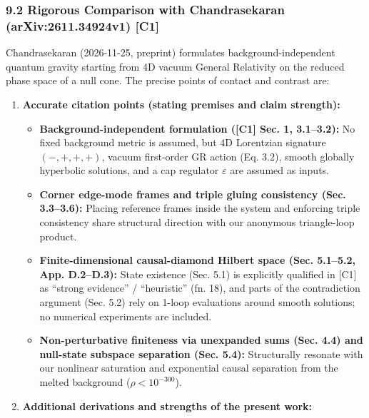 \documentclass[
  a4paper,
]{article}
\providecommand{\tightlist}{%
  \setlength{\itemsep}{0pt}\setlength{\parskip}{0pt}}
\begin{document}
\subsubsection{9.2 Rigorous Comparison with Chandrasekaran
(arXiv:2611.34924v1)
{[}C1{]}}\label{rigorous-comparison-with-chandrasekaran-arxiv2611.34924v1-c1}

Chandrasekaran (2026-11-25, preprint) formulates background-independent
quantum gravity starting from 4D vacuum General Relativity on the
reduced phase space of a null cone. The precise points of contact and
contrast are:

\begin{enumerate}
\def\labelenumi{\arabic{enumi}.}
\tightlist
\item
  \textbf{Accurate citation points (stating premises and claim
  strength):}

  \begin{itemize}
  \tightlist
  \item
    \textbf{Background-independent formulation ({[}C1{]} Sec. 1,
    3.1--3.2):} No fixed background metric is assumed, but 4D Lorentzian
    signature \((-,+,+,+)\), vacuum first-order GR action (Eq. 3.2),
    smooth globally hyperbolic solutions, and a cap regulator
    \(\varepsilon\) are assumed as inputs.
  \item
    \textbf{Corner edge-mode frames and triple gluing consistency (Sec.
    3.3--3.6):} Placing reference frames inside the system and enforcing
    triple consistency share structural direction with our anonymous
    triangle-loop product.
  \item
    \textbf{Finite-dimensional causal-diamond Hilbert space (Sec.
    5.1--5.2, App. D.2--D.3):} State existence (Sec. 5.1) is explicitly
    qualified in {[}C1{]} as ``strong evidence'' / ``heuristic'' (fn.
    18), and parts of the contradiction argument (Sec. 5.2) rely on
    1-loop evaluations around smooth solutions; no numerical experiments
    are included.
  \item
    \textbf{Non-perturbative finiteness via unexpanded sums (Sec. 4.4)
    and null-state subspace separation (Sec. 5.4):} Structurally
    resonate with our nonlinear saturation and exponential causal
    separation from the melted background (\(\rho < 10^{-300}\)).
  \end{itemize}
\item
  \textbf{Additional derivations and strengths of the present work:}


\end{enumerate}
\end{document}
